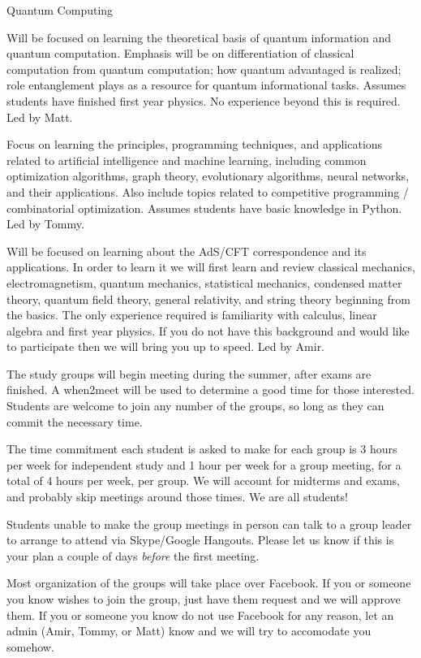 \documentclass[mpinclude=true]{scrartcl}
\begin{document}
\begin{labeling}
{Quantum Computing}\item[Quantum Computing] Will be focused on learning the theoretical
basis of quantum information and quantum computation.  Emphasis will
be on differentiation of classical computation from quantum
computation; how quantum advantaged is realized; role entanglement
plays as a resource for quantum informational tasks.  Assumes students
have finished first year physics.  No experience beyond this is
required.  Led by Matt.
\item[AI] Focus on learning the principles, programming techniques, and applications related to artificial intelligence and machine learning, including common optimization algorithms, graph theory, evolutionary algorithms, neural networks, and their applications. Also include topics related to competitive programming / combinatorial optimization. Assumes students have basic knowledge in Python. Led by Tommy.
\item[Holographic Duality] Will be focused on learning about the AdS/CFT
correspondence and its applications. In order to learn it we will
first learn and review classical mechanics, electromagnetism, quantum
mechanics, statistical mechanics, condensed matter theory, quantum
field theory, general relativity, and string theory beginning from the
basics. The only experience required is familiarity with calculus,
linear algebra and first year physics. If you do not have this
background and would like to participate then we will bring you up to
speed. Led by Amir.
\end{labeling}

The study groups will begin meeting during the summer, after exams are
finished.  A when2meet will be used to determine a good time for those
interested.  Students are welcome to join any number of the groups, so
long as they can commit the necessary time.

The time commitment each student is asked to make for each group is 3
hours per week for independent study and 1 hour per week for a group
meeting, for a total of 4 hours per week, per group.  We will account
for midterms and exams, and probably skip meetings around those times.
We are all students!

Students unable to make the group meetings in person can talk to a
group leader to arrange to attend via Skype/Google Hangouts.  Please
let us know if this is your plan a couple of days \emph{before} the first
meeting.

Most organization of the groups will take place over Facebook.  If you
or someone you know wishes to join the group, just have them request
and we will approve them.  If you or someone you know do not use
Facebook for any reason, let an admin (Amir, Tommy, or Matt) know and
we will try to accomodate you somehow.
\end{document}
